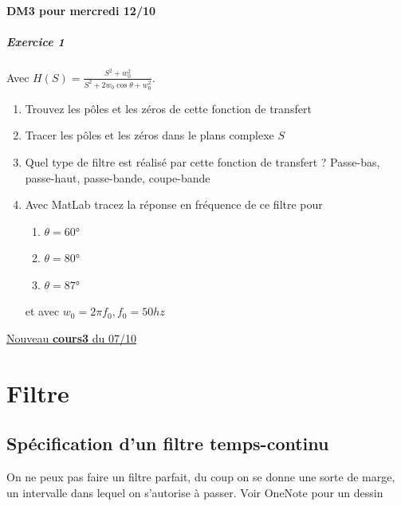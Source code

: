 \documentclass{article}
\theoremstyle{plain}%
\theoremstyle{definition}
\theoremstyle{remark}
\begin{document}
\paragraph*{DM3 pour mercredi 12/10}
\subparagraph*{Exercice 1}
Avec $ H(S) = \frac{S^2 + w_0^2}{S^2 + 2w_0 \cos \theta + w_0^2} $. \begin{enumerate}
    \item Trouvez les pôles et les zéros de cette fonction de transfert
    \item Tracer les pôles et les zéros dans le plans complexe $ S $ 
    \item Quel type de filtre est réalisé par cette fonction de transfert ? Passe-bas, passe-haut, passe-bande, coupe-bande
    \item Avec MatLab tracez la réponse en fréquence de ce filtre pour \begin{enumerate}
        \item $ \theta = 60 \text{°}$
        \item $ \theta = 80 \text{°}$
        \item $ \theta = 87 \text{°}$
    \end{enumerate}
    et avec $ w_0 = 2 \pi f_0, f_0 = 50hz $ 
\end{enumerate}

\underline{Nouveau \textbf{cours3} du 07/10} \\

\section{Filtre}
\subsection{Spécification d'un filtre temps-continu}
On ne peux pas faire un filtre parfait, du coup on se donne une sorte de marge, un intervalle dans lequel on s'autorise à passer. Voir OneNote pour un dessin
\end{document}
